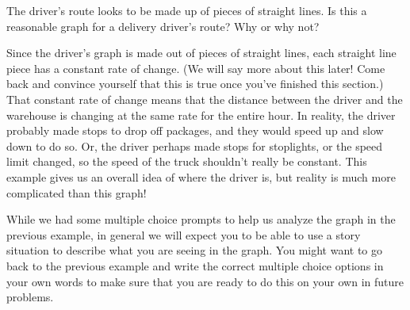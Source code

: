 \documentclass{ximera}
\begin{document}
\begin{example}
The driver's route looks to be made up of pieces of straight lines. Is this a reasonable graph for a delivery driver's route? Why or why not?
\begin{multipleChoice}
\begin{feedback}[correct]
Since the driver's graph is made out of pieces of straight lines, each straight line piece has a constant rate of change. (We will say more about this later! Come back and convince yourself that this is true once you've finished this section.) That constant rate of change means that the distance between the driver and the warehouse is changing at the same rate for the entire hour. In reality, the driver probably made stops to drop off packages, and they would speed up and slow down to do so. Or, the driver perhaps made stops for stoplights, or the speed limit changed, so the speed of the truck shouldn't really be constant. This example gives us an overall idea of where the driver is, but reality is much more complicated than this graph!
\end{feedback}
\end{multipleChoice}

\end{example}
While we had some multiple choice prompts to help us analyze the graph in the previous example, in general we will expect you to be able to use a story situation to describe what you are seeing in the graph. You might want to go back to the previous example and write the correct multiple choice options in your own words to make sure that you are ready to do this on your own in future problems.
\end{document}
